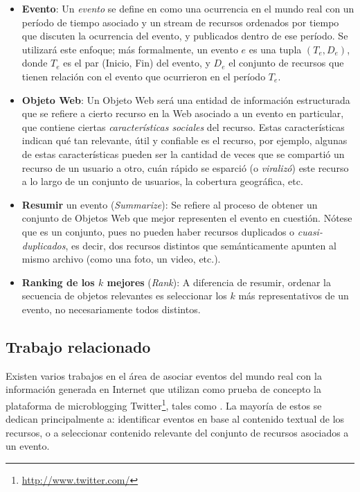 \documentclass[11pt]{article}
\begin{document}
\begin{itemize}
\item \textbf{Evento}: Un \emph{evento} se define en \cite{concerts} como una ocurrencia en el mundo real con un período de tiempo asociado y un stream de recursos ordenados por tiempo que discuten la ocurrencia del evento, y publicados dentro de ese período. Se utilizará este enfoque; más formalmente, un evento $e$ es una tupla $(T_e, D_e)$, donde $T_e$ es el par (Inicio, Fin) del evento, y $D_e$ el conjunto de recursos que tienen relación con el evento que ocurrieron en el período $T_e$.
\item \textbf{Objeto Web}: Un Objeto Web será una entidad de información estructurada que se refiere a cierto recurso en la Web asociado a un evento en particular, que contiene ciertas \emph{características sociales} del recurso. Estas características indican qué tan relevante, útil y confiable es el recurso, por ejemplo, algunas de estas características pueden ser la cantidad de veces que se compartió un recurso de un usuario a otro, cuán rápido se esparció (o \emph{viralizó}) este recurso a lo largo de un conjunto de usuarios, la cobertura geográfica, etc.
\item \textbf{Resumir} un evento (\emph{Summarize}): Se refiere al proceso de obtener un conjunto de Objetos Web que mejor representen el evento en cuestión. Nótese que es un conjunto, pues no pueden haber recursos duplicados o \emph{cuasi-duplicados}, es decir, dos recursos distintos que semánticamente apunten al mismo archivo (como una foto, un video, etc.).
\item \textbf{Ranking de los $k$ mejores} (\emph{Rank}): A diferencia de resumir, ordenar la secuencia de objetos relevantes es seleccionar los $k$ más representativos de un evento, no necesariamente todos distintos.
\end{itemize}
\subsection{Trabajo relacionado}
\label{sec-1.2}

 
  Existen varios trabajos en el área de asociar eventos del mundo real con la información generada en Internet que utilizan como prueba de concepto la plataforma de microblogging Twitter\footnote{\href{http://www.twitter.com/}{http://www.twitter.com/} }, tales como \cite{events, real}. La mayoría de estos se dedican principalmente a: identificar eventos en base al contenido textual de los recursos, o a seleccionar contenido relevante del conjunto de recursos asociados a un evento.\\
\end{document}
